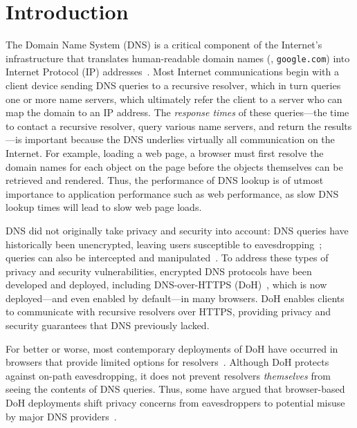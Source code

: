 \section{Introduction}\label{sec:intro}

The Domain Name System (DNS) is a critical component of the Internet's
infrastructure that translates human-readable domain names (\eg,
\texttt{google.com}) into Internet Protocol (IP) addresses~\cite{rfc1035}.
Most Internet communications begin with a client device sending DNS queries to
a recursive resolver, which in turn queries one or more name servers, which
ultimately refer the client to a server who can map the domain to an IP
address.
The \emph{response times} of these queries---the time 
to contact a recursive resolver, query various name servers, and return
the results---is important because the DNS underlies virtually all
communication on the Internet.  For example, loading a
web page, a browser must first resolve the domain names for each object on the
page before the objects themselves can be retrieved and rendered.  Thus, the
performance of DNS lookup is of utmost importance to application performance
such as web performance, as slow DNS lookup times will lead to slow web page
loads.

DNS did not originally take privacy and security into account: DNS queries
have historically been unencrypted, leaving users susceptible to
eavesdropping~\cite{schmitt2019:odns:pets}; queries can also be intercepted and
manipulated~\cite{jones2016detecting}.  To
address these types of privacy and security vulnerabilities, encrypted DNS
protocols have been developed and deployed, including DNS-over-HTTPS
(DoH)~\cite{rfc8484}, which is now deployed---and even enabled by default---in
many browsers.  DoH enables clients to communicate with recursive resolvers
over HTTPS, providing privacy and security guarantees that DNS previously
lacked.

For better or worse, most contemporary deployments of DoH have occurred in
browsers that provide limited options for
resolvers~\cite{ffChoices,chromeResolvers}.  Although DoH
protects against on-path eavesdropping, it does not prevent resolvers
\emph{themselves} from seeing the contents of DNS queries.  Thus, some have
argued that browser-based DoH deployments shift privacy concerns from
eavesdroppers to potential misuse by major DNS providers~\cite{vixie}.

